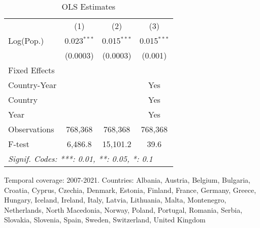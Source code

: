 
\begin{table}[htbp]
   \caption{\label{tab:ols1} OLS Estimates}
   \centering
   \small
   \begin{tabular}{lccc}
      \tabularnewline \midrule \midrule
                   & (1)           & (2)           & (3)\\  
      Log(Pop.)    & 0.023$^{***}$ & 0.015$^{***}$ & 0.015$^{***}$\\   
                   & (0.0003)      & (0.0003)      & (0.001)\\   
      Fixed Effects\\
      Country-Year &               &               & Yes\\  
      Country      &               &               & Yes\\  
      Year         &               &               & Yes\\  
      \midrule 
      Observations & 768,368       & 768,368       & 768,368\\  
      F-test       & 6,486.8       & 15,101.2      & 39.6\\  
      \midrule \midrule
      \multicolumn{4}{l}{\emph{Signif. Codes: ***: 0.01, **: 0.05, *: 0.1}}\\
   \end{tabular}
   
   \par \raggedright 
   Temporal coverage: 2007-2021. Countries: Albania, Austria, Belgium, Bulgaria, Croatia, Cyprus, Czechia, Denmark, Estonia, Finland, France, Germany, Greece, Hungary, Iceland, Ireland, Italy, Latvia, Lithuania, Malta, Montenegro, Netherlands, North Macedonia, Norway, Poland, Portugal, Romania, Serbia, Slovakia, Slovenia, Spain, Sweden, Switzerland, United Kingdom
\end{table}


